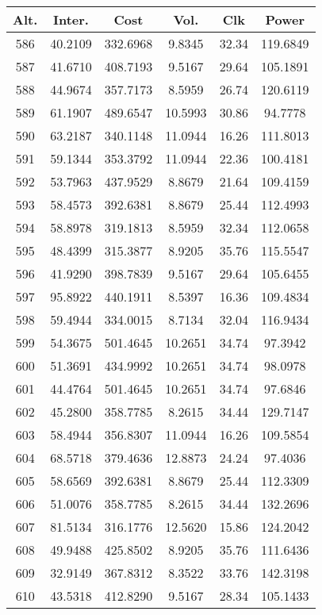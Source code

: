 \begin{center}
\begin{footnotesize}
\begin{tabular}{|c|ccccc|}
\hline
Alt. & Inter. & Cost & Vol. & Clk & Power\\
\hline
586 & 40.2109 & 332.6968 & 9.8345 & 32.34 & 119.6849 \\
587 & 41.6710 & 408.7193 & 9.5167 & 29.64 & 105.1891 \\
588 & 44.9674 & 357.7173 & 8.5959 & 26.74 & 120.6119 \\
589 & 61.1907 & 489.6547 & 10.5993 & 30.86 & 94.7778 \\
590 & 63.2187 & 340.1148 & 11.0944 & 16.26 & 111.8013 \\
591 & 59.1344 & 353.3792 & 11.0944 & 22.36 & 100.4181 \\
592 & 53.7963 & 437.9529 & 8.8679 & 21.64 & 109.4159 \\
593 & 58.4573 & 392.6381 & 8.8679 & 25.44 & 112.4993 \\
594 & 58.8978 & 319.1813 & 8.5959 & 32.34 & 112.0658 \\
595 & 48.4399 & 315.3877 & 8.9205 & 35.76 & 115.5547 \\
596 & 41.9290 & 398.7839 & 9.5167 & 29.64 & 105.6455 \\
597 & 95.8922 & 440.1911 & 8.5397 & 16.36 & 109.4834 \\
598 & 59.4944 & 334.0015 & 8.7134 & 32.04 & 116.9434 \\
599 & 54.3675 & 501.4645 & 10.2651 & 34.74 & 97.3942 \\
600 & 51.3691 & 434.9992 & 10.2651 & 34.74 & 98.0978 \\
601 & 44.4764 & 501.4645 & 10.2651 & 34.74 & 97.6846 \\
602 & 45.2800 & 358.7785 & 8.2615 & 34.44 & 129.7147 \\
603 & 58.4944 & 356.8307 & 11.0944 & 16.26 & 109.5854 \\
604 & 68.5718 & 379.4636 & 12.8873 & 24.24 & 97.4036 \\
605 & 58.6569 & 392.6381 & 8.8679 & 25.44 & 112.3309 \\
606 & 51.0076 & 358.7785 & 8.2615 & 34.44 & 132.2696 \\
607 & 81.5134 & 316.1776 & 12.5620 & 15.86 & 124.2042 \\
608 & 49.9488 & 425.8502 & 8.9205 & 35.76 & 111.6436 \\
609 & 32.9149 & 367.8312 & 8.3522 & 33.76 & 142.3198 \\
610 & 43.5318 & 412.8290 & 9.5167 & 28.34 & 105.1433 \\

\end{tabular}
\end{footnotesize}
\end{center}
